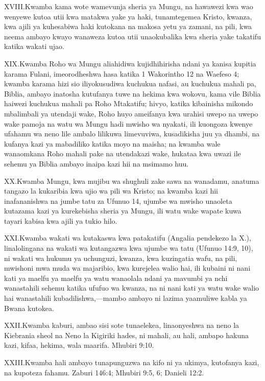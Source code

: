 \lettrine{XVIII.} Kwamba kama wote wamevunja sheria ya Mungu, na hawawezi kwa wao wenyewe kutoa utii kwa matakwa yake ya haki, tunamtegemea Kristo, kwanza, kwa ajili ya kuhesabiwa haki kutokana na makosa yetu ya zamani, na pili, kwa neema ambayo kwayo wanaweza kutoa utii unaokubalika kwa sheria yake takatifu katika wakati ujao.

\lettrine{XIX.} Kwamba Roho wa Mungu aliahidiwa kujidhihirisha ndani ya kanisa kupitia karama Fulani, imeorodheshwa hasa katika 1 Wakorintho 12 na Waefeso 4; kwamba karama hizi sio iliyokusudiwa kuchukua nafasi, au kuchukua mahali pa, Biblia, ambayo inatosha kutufanya tuwe na hekima kwa wokovu, kama vile Biblia haiwezi kuchukua mahali pa Roho Mtakatifu; hivyo, katika kibainisha mikondo mbalimbali ya utendaji wake, Roho huyo ameifanya kwa urahisi uwepo na uwepo wake pamoja na watu wa Mungu hadi mwisho wa nyakati, ili kuongoza kwenye ufahamu wa neno lile ambalo lilikuwa limevuviwa, kusadikisha juu ya dhambi, na kufanya kazi ya mabadiliko katika moyo na maisha; na kwamba wale wanaomkana Roho mahali pake na utendakazi wake, hukataa kwa uwazi ile sehemu ya Biblia ambayo inaipa kazi hii na msimamo huu.

\lettrine{XX.} Kwamba Mungu, kwa mujibu wa shughuli zake sawa na wanadamu, anatuma tangazo la kukaribia kwa ujio wa pili wa Kristo; na kwamba kazi hii inafananishwa na jumbe tatu za Ufunuo 14, ujumbe wa mwisho unaoleta kutazama kazi ya kurekebisha sheria ya Mungu, ili watu wake wapate kuwa tayari kabisa kwa ajili ya tukio hilo.

\lettrine{XXI.} Kwamba wakati wa kutakaswa kwa patakatifu (Angalia pendekezo la X.), linalolingana na wakati wa kutangazwa kwa ujumbe wa tatu (Ufunuo 14:9, 10), ni wakati wa hukumu ya uchunguzi, kwanza, kwa kuzingatia wafu, na pili, mwishoni mwa muda wa majaribio, kwa kurejelea walio hai, ili kubaini ni nani kati ya maelfu ya maelfu ya watu wanaolala ndani ya mavumbi ya nchi wanastahili sehemu katika ufufuo wa kwanza, na ni nani kati ya watu wake walio hai wanastahili kubadilishwa,—mambo ambayo ni lazima yaamuliwe kabla ya Bwana kutokea.

\lettrine{XXII.} Kwamba kaburi, ambao sisi sote tunaelekea, linaonyeshwa na neno la Kiebrania sheol na Neno la Kigiriki hades, ni mahali, au hali, ambapo hakuna kazi, kifaa, hekima, wala maarifa. Mhubiri 9:10.

\lettrine{XXIII.} Kwamba hali ambayo tunapunguzwa na kifo ni ya ukimya, kutofanya kazi, na kupoteza fahamu. Zaburi 146:4; Mhubiri 9:5, 6; Danieli 12:2.

